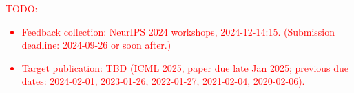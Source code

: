 \documentclass{article}
\begin{document}
\textcolor{red}{TODO:
\begin{itemize}
\item
  Feedback collection: NeurIPS 2024 workshops, 2024-12-14:15.
  (Submission deadline: 2024-09-26 or soon after.)
\item
  Target publication: TBD (ICML 2025, paper due late Jan 2025; previous
  due dates: 2024-02-01, 2023-01-26, 2022-01-27, 2021-02-04,
  2020-02-06).
\end{itemize}
}





\end{document}
